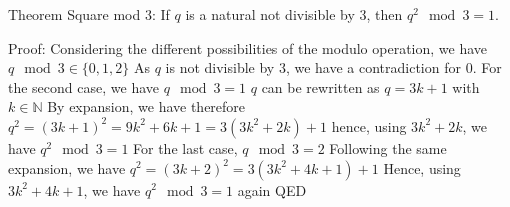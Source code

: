 Theorem Square mod 3:
If $q$ is a natural not divisible by $3$, then $q^2 \mod 3 = 1$.


Proof:
Considering the different possibilities of the modulo operation, we have $q \mod 3 \in \{ 0, 1, 2 \}$
As $q$ is not divisible by $3$, we have a contradiction for $0$.
For the second case, we have $q \mod 3 = 1$
    $q$ can be rewritten as $q = 3k + 1$ with $k \in \mathbb{N}$
    By expansion, we have therefore $q^2 = (3k+1)^2 = 9k^2+6k+1 = 3(3k^2 + 2k) + 1$
    hence, using $3k^2 + 2k$, we have $q^2 \mod 3 = 1$
For the last case, $q \mod 3 = 2$
    Following the same expansion, we have $q^2 = (3k+2)^2 = 3(3k^2+4k+1) +1$
    Hence, using $3k^2 + 4k + 1$, we have $q^2 \mod 3 = 1$ again
QED